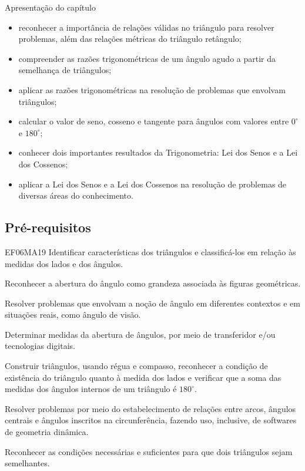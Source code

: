 \begin{apresentacao}{Apresentação do capítulo}
\begin{itemize}
\item reconhecer a importância de relações válidas no triângulo para resolver problemas, além das relações métricas do triângulo retângulo;
%
\item compreender as razões trigonométricas de um ângulo agudo a partir da semelhança de triângulos;
%
\item aplicar as razões trigonométricas na resolução de problemas que envolvam triângulos;
%
\item calcular o valor de seno, cosseno e tangente para ângulos com valores entre $0^\circ$ e $180^\circ$;
%
\item conhecer dois importantes resultados da Trigonometria:  Lei dos Senos e a Lei dos Cossenos;
%
\item aplicar a Lei dos Senos e a Lei dos Cossenos na resolução de problemas de diversas áreas do conhecimento.
\end{itemize}

\subsection*{Pré-requisitos}
\begin{habilities}{EF06MA19}
Identificar características dos triângulos e classificá-los em relação às medidas dos lados e dos ângulos.

 Reconhecer a abertura do ângulo como grandeza associada às figuras geométricas.

 Resolver problemas que envolvam a noção de ângulo em diferentes contextos e em situações reais, como ângulo de visão.

 Determinar medidas da abertura de ângulos, por meio de transferidor e/ou tecnologias digitais.

 Construir triângulos, usando régua e compasso, reconhecer a condição de existência do triângulo quanto à medida dos lados e verificar que a soma das medidas dos ângulos internos de um triângulo é $180^\circ$.

 Resolver problemas por meio do estabelecimento de relações entre arcos, ângulos centrais e ângulos inscritos na circunferência, fazendo uso, inclusive, de softwares de geometria dinâmica.

 Reconhecer as condições necessárias e suficientes para que dois triângulos sejam semelhantes.


\end{habilities}
\end{apresentacao}
